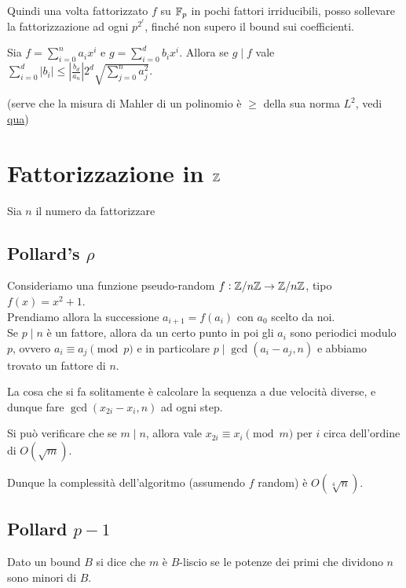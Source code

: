 \documentclass[a4paper]{book}
\begin{document}
    Quindi una volta fattorizzato $f$ su $\mathbb{F}_p$ in pochi fattori irriducibili, posso sollevare la fattorizzazione ad ogni $p^{2^\ell}$, finché non supero il bound sui coefficienti.

    \begin{proposition}[Mignotte]
        Sia $f=\sum_{i=0}^n a_ix^i$ e $g=\sum_{i=0}^d b_ix^i$. Allora se $g\mid f$ vale $\sum_{i=0}^d |b_i|\le \left|\frac{b_d}{a_n}\right|2^d\sqrt{\sum_{j=0}^n a_j^2}$.
    \end{proposition}
    (serve che la misura di Mahler di un polinomio è $\ge$ della sua norma $L^2$, vedi \href{http://people.dm.unipi.it/gianni/TC&C/Mignotte.pdf}{qua})

    \section{Fattorizzazione in $\mathbb{Z}$}
    Sia $n$ il numero da fattorizzare

    \subsection{Pollard's $\rho$}
    Consideriamo una funzione pseudo-random $f:\mathbb{Z}/n\mathbb{Z}\to\mathbb{Z}/n\mathbb{Z}$, tipo $f(x)=x^2+1$.\\
    Prendiamo allora la successione $a_{i+1}=f(a_i)$ con $a_0$ scelto da noi.\\
    Se $p\mid n$ è un fattore, allora da un certo punto in poi gli $a_i$ sono periodici modulo $p$, ovvero $a_i\equiv a_j\pmod p$ e in particolare $p\mid\gcd(a_i-a_j,n)$ e abbiamo trovato un fattore di $n$.

    La cosa che si fa solitamente è calcolare la sequenza a due velocità diverse, e dunque fare $\gcd(x_{2i}-x_i,n)$ ad ogni step.

    Si può verificare che se $m\mid n$, allora vale $x_{2i}\equiv x_i\pmod m$ per $i$ circa dell'ordine di $O(\sqrt m)$.

    Dunque la complessità dell'algoritmo (assumendo $f$ random) è $O(\sqrt[4] n)$.


    \subsection{Pollard $p-1$}
    \begin{definition}
        Dato un bound $B$ si dice che $m$ è $B$-liscio se le potenze dei primi che dividono $n$ sono minori di $B$.
    \end{definition}
\end{document}
